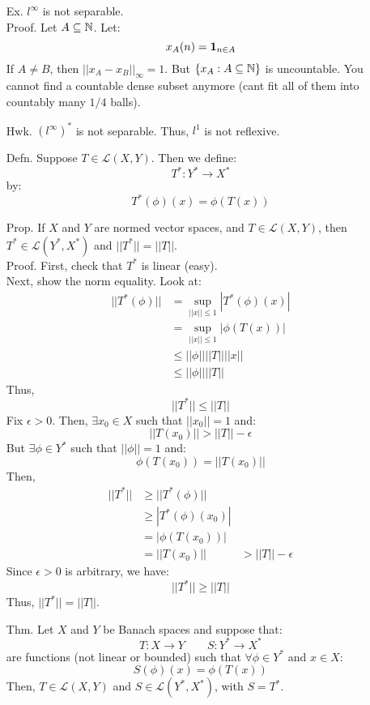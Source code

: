 \documentclass[12pt]{article}
\begin{document}
\begin{itemize}
    \item[Ex.] $l^\infty$ is not separable. \\
    Proof. Let $A \subseteq \mathbb N$. Let: 
    \[ x_A(n) = \mathbf{1}_{n \in A}\]
    If $A \neq B$, then $||x_A - x_B||_\infty = 1$. But $\{x_A : A \subseteq \mathbb N\}$ is uncountable. You cannot find a countable dense subset anymore (cant fit all of them into countably many $1/4$ balls).
    \item[Hwk.] $(l^\infty)^*$ is not separable. Thus, $l^1$ is not reflexive.  
    \item[Defn.] Suppose $T \in \mathcal{L}(X, Y)$. Then we define: 
    \[ T^*: Y^* \to X^*\]
    by: 
    \[ T^*(\phi)(x) = \phi(T(x))\]
    \item[Prop.] If $X$ and $Y$ are normed vector spaces, and $T \in \mathcal{L}(X,Y)$, then $T^* \in \mathcal{L}(Y^*, X^*)$ and $||T^*|| = ||T||$. \\
    Proof. First, check that $T^*$ is linear (easy). \\
    Next, show the norm equality. Look at: 
    \begin{align*}
        ||T^*(\phi)|| &= \sup_{||x|| \leq 1} |T^*(\phi)(x)| \\
        &= \sup_{||x|| \leq 1} |\phi(T(x))| \\
        &\leq ||\phi||||T||||x|| \\
        &\leq ||\phi||||T||
    \end{align*}
    Thus, 
    \[ ||T^*|| \leq ||T||\] 
    Fix $\epsilon > 0$. Then, $\exists x_0 \in X$ such that $||x_0|| = 1$ and: 
    \[ ||T(x_0)|| > ||T|| - \epsilon\]
    But $\exists \phi \in Y^*$ such that $||\phi|| = 1$ and:
    \[ \phi(T(x_0)) = ||T(x_0)|| \]
    Then, 
    \begin{align*}
        ||T^*|| &\geq ||T^*(\phi)|| \\
        &\geq |T^*(\phi)(x_0)| \\
        &= |\phi(T(x_0))| \\
        &= ||T(x_0)||
        &> ||T|| - \epsilon
    \end{align*}
    Since $\epsilon > 0$ is arbitrary, we have:
    \[ ||T^*|| \geq ||T||\]
    Thus, $||T^*|| = ||T||$.
    \item[Thm.] Let $X$ and $Y$ be Banach spaces and suppose that: 
    \[ T: X \to Y \qquad S: Y^* \to X^* \]
    are functions (not linear or bounded) such that $\forall \phi \in Y^*$ and $x \in X$: 
    \[ S(\phi)(x) = \phi(T(x)) \]
    Then, $T \in \mathcal{L}(X,Y)$ and $S \in \mathcal{L}(Y^*, X^*)$, with $S = T^*$. \\

\end{itemize}
\end{document}
